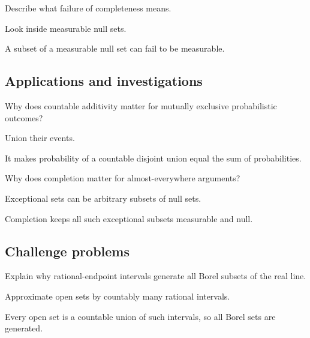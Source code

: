 \begin{exercise}\label{exr:iii01-expand-12}
Describe what failure of completeness means.
\end{exercise}
\begin{hint}
Look inside measurable null sets.
\end{hint}
\begin{solution}
A subset of a measurable null set can fail to be measurable.
\end{solution}

\subsection*{Applications and investigations}

\begin{exercise}\label{exr:iii01-expand-13}
Why does countable additivity matter for mutually exclusive probabilistic outcomes?
\end{exercise}
\begin{hint}
Union their events.
\end{hint}
\begin{solution}
It makes probability of a countable disjoint union equal the sum of probabilities.
\end{solution}

\begin{exercise}\label{exr:iii01-expand-14}
Why does completion matter for almost-everywhere arguments?
\end{exercise}
\begin{hint}
Exceptional sets can be arbitrary subsets of null sets.
\end{hint}
\begin{solution}
Completion keeps all such exceptional subsets measurable and null.
\end{solution}

\subsection*{Challenge problems}

\begin{exercise}\label{exr:iii01-expand-15}
Explain why rational-endpoint intervals generate all Borel subsets of the real line.
\end{exercise}
\begin{hint}
Approximate open sets by countably many rational intervals.
\end{hint}
\begin{solution}
Every open set is a countable union of such intervals, so all Borel sets are generated.
\end{solution}

